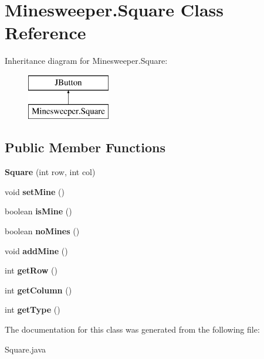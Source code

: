 \hypertarget{class_minesweeper_1_1_square}{}\section{Minesweeper.\+Square Class Reference}
\label{class_minesweeper_1_1_square}
Inheritance diagram for Minesweeper.\+Square\+:\begin{figure}[H]
\begin{center}
\leavevmode
\includegraphics[height=2.000000cm]{class_minesweeper_1_1_square}
\end{center}
\end{figure}
\subsection*{Public Member Functions}
\begin{DoxyCompactItemize}
\item 
\mbox{\label{class_minesweeper_1_1_square_a3e39a7f05b7c42865cf9844769352386}} 
{\bfseries Square} (int row, int col)
\item 
\mbox{\label{class_minesweeper_1_1_square_a4bdd081dd7aa267ece7240dc3fcab06e}} 
void {\bfseries set\+Mine} ()
\item 
\mbox{\label{class_minesweeper_1_1_square_ad0a380daf44435fbbb25b8067184664a}} 
boolean {\bfseries is\+Mine} ()
\item 
\mbox{\label{class_minesweeper_1_1_square_ac89e00bfc6013521be4bcc0a5bb00b0b}} 
boolean {\bfseries no\+Mines} ()
\item 
\mbox{\label{class_minesweeper_1_1_square_a6fa68255c04a077ede4af229ec29c85a}} 
void {\bfseries add\+Mine} ()
\item 
\mbox{\label{class_minesweeper_1_1_square_aeaa596c8dd643bd7735fa13078947a3f}} 
int {\bfseries get\+Row} ()
\item 
\mbox{\label{class_minesweeper_1_1_square_ac034763d2a72bd1161d57eaabd963ba6}} 
int {\bfseries get\+Column} ()
\item 
\mbox{\label{class_minesweeper_1_1_square_a447093a2ff29144d18eeb99a8e452de3}} 
int {\bfseries get\+Type} ()
\end{DoxyCompactItemize}


The documentation for this class was generated from the following file\+:\begin{DoxyCompactItemize}
\item 
Square.\+java\end{DoxyCompactItemize}
